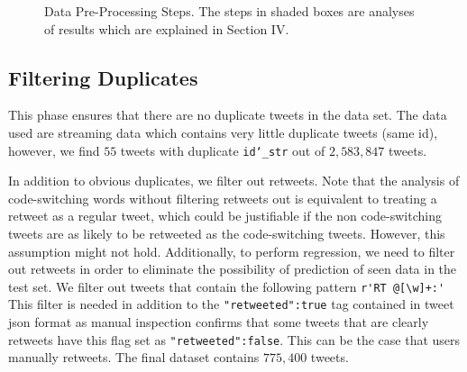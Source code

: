 \documentclass[conference]{IEEEtran}
\begin{document}
\begin{figure}[h!]
\label{fig:process}
\caption{Data Pre-Processing Steps. The steps in shaded boxes are analyses of results which are explained in Section IV. }
\end{figure}

\subsection{Filtering Duplicates}

This phase ensures that there are no duplicate tweets in the data set. The data used are streaming data which contains very little duplicate tweets (same id), however, we find $55$ tweets with duplicate {\tt id\char`_str}  out of $2,583,847$ tweets. 


In addition to obvious duplicates, we filter out retweets. Note that the analysis of code-switching words without filtering retweets out is equivalent to treating a retweet as a regular tweet, which could be justifiable if the non code-switching tweets are as likely to be retweeted as the code-switching tweets. However, this assumption might not hold. Additionally, to perform regression, we need to filter out retweets in order to eliminate the possibility of prediction of seen data in the test set. We filter out tweets that contain the following pattern \verb|r'RT @[\w]+:'| This filter is needed in addition to the {\tt "retweeted":true} tag contained in tweet json format as manual inspection confirms that some tweets that are clearly retweets  have this flag set as {\tt "retweeted":false}. This  can be the case that users manually retweets. The final dataset contains $775,400$ tweets. 
\end{document}
